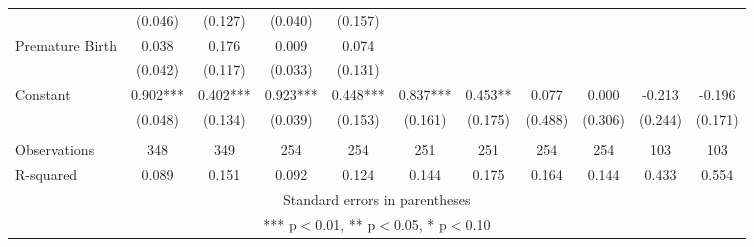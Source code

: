 \begin{tabular}{lcccccccccc}
 & (0.046) & (0.127) & (0.040) & (0.157) &  &  &  &  &  &  \\
Premature Birth & 0.038 & 0.176 & 0.009 & 0.074 &  &  &  &  &  &  \\
 & (0.042) & (0.117) & (0.033) & (0.131) &  &  &  &  &  &  \\
Constant & 0.902*** & 0.402*** & 0.923*** & 0.448*** & 0.837*** & 0.453** & 0.077 & 0.000 & -0.213 & -0.196 \\
 & (0.048) & (0.134) & (0.039) & (0.153) & (0.161) & (0.175) & (0.488) & (0.306) & (0.244) & (0.171) \\
 &  &  &  &  &  &  &  &  &  &  \\
Observations & 348 & 349 & 254 & 254 & 251 & 251 & 254 & 254 & 103 & 103 \\
 R-squared & 0.089 & 0.151 & 0.092 & 0.124 & 0.144 & 0.175 & 0.164 & 0.144 & 0.433 & 0.554 \\ \hline
\multicolumn{11}{c}{ Standard errors in parentheses} \\
\multicolumn{11}{c}{ *** p$<$0.01, ** p$<$0.05, * p$<$0.10} \\
\end{tabular}

